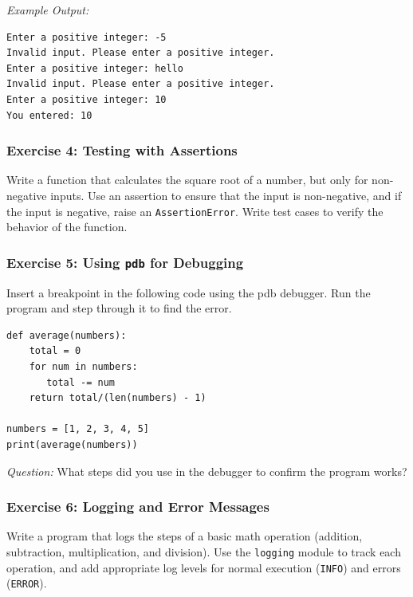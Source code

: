 \documentclass[
  letterpaper,
  DIV=11,
  numbers=noendperiod]{scrreprt}
\begin{document}
\emph{Example Output:}

\begin{verbatim}
Enter a positive integer: -5
Invalid input. Please enter a positive integer.
Enter a positive integer: hello
Invalid input. Please enter a positive integer.
Enter a positive integer: 10
You entered: 10
\end{verbatim}

\hypertarget{exercise-4-testing-with-assertions}{%
\subsubsection{Exercise 4: Testing with
Assertions}\label{exercise-4-testing-with-assertions}}

Write a function that calculates the square root of a number, but only
for non-negative inputs. Use an assertion to ensure that the input is
non-negative, and if the input is negative, raise an
\texttt{AssertionError}. Write test cases to verify the behavior of the
function.

\hypertarget{exercise-5-using-pdb-for-debugging}{%
\subsubsection{\texorpdfstring{Exercise 5: Using \texttt{pdb} for
Debugging}{Exercise 5: Using pdb for Debugging}}\label{exercise-5-using-pdb-for-debugging}}

Insert a breakpoint in the following code using the pdb debugger. Run
the program and step through it to find the error.

\begin{verbatim}
def average(numbers):
    total = 0
    for num in numbers:
       total -= num
    return total/(len(numbers) - 1)
    
numbers = [1, 2, 3, 4, 5]
print(average(numbers))
\end{verbatim}

\emph{Question:} What steps did you use in the debugger to confirm the
program works?

\hypertarget{exercise-6-logging-and-error-messages}{%
\subsubsection{Exercise 6: Logging and Error
Messages}\label{exercise-6-logging-and-error-messages}}

Write a program that logs the steps of a basic math operation (addition,
subtraction, multiplication, and division). Use the \texttt{logging}
module to track each operation, and add appropriate log levels for
normal execution (\texttt{INFO}) and errors (\texttt{ERROR}).
\end{document}
